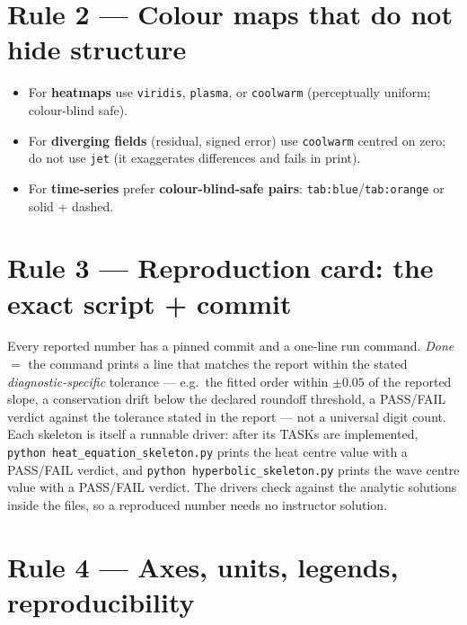 \documentclass[11pt]{article}
\begin{document}
\section*{Rule 2 --- Colour maps that do not hide structure}

\begin{itemize}[leftmargin=2em, itemsep=1pt]
  \item For \textbf{heatmaps} use \texttt{viridis}, \texttt{plasma}, or
        \texttt{coolwarm} (perceptually uniform; colour-blind safe).
  \item For \textbf{diverging fields} (residual, signed error) use
        \texttt{coolwarm} centred on zero; do not use \texttt{jet} (it
        exaggerates differences and fails in print).
  \item For \textbf{time-series} prefer \textbf{colour-blind-safe pairs}:
        \texttt{tab:blue}/\texttt{tab:orange} or solid + dashed.
\end{itemize}

\section*{Rule 3 --- Reproduction card: the exact script + commit}

Every reported number has a pinned commit and a one-line run command.
\textit{Done} $=$ the command prints a line that matches the report
within the stated \emph{diagnostic-specific} tolerance --- e.g.\ the
fitted order within $\pm0.05$ of the reported slope, a conservation
drift below the declared roundoff threshold, a PASS/FAIL verdict
against the tolerance stated in the report --- not a universal digit
count. Each skeleton is itself a runnable driver: after its TASKs are
implemented, \texttt{python heat\_equation\_skeleton.py} prints the heat
centre value with a PASS/FAIL verdict, and
\texttt{python hyperbolic\_skeleton.py} prints the wave centre value with a
PASS/FAIL verdict. The drivers check against the analytic solutions inside
the files, so a reproduced number needs no instructor solution.

\section*{Rule 4 --- Axes, units, legends, reproducibility}
\end{document}
